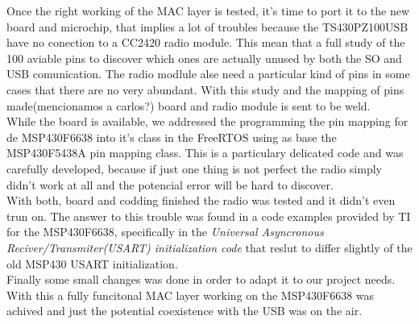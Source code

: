 		Once the right working of the MAC layer is tested, it's time to port it to the new board and microchip, that implies a lot of troubles because the TS430PZ100USB have no conection to a CC2420 radio module. This mean that a full study of the 100 aviable pins to discover which ones are actually unused by both the SO and USB comunication. The radio modlule alse need a particular kind of pins in some cases that there are no very abundant. With this study and the mapping of pins made(mencionamos a carlos?) board and radio module is sent to be weld.\\

		While the board is available, we addressed the programming the pin mapping for de MSP430F6638 into it's class in the FreeRTOS using as base the MSP430F5438A pin mapping class. This is a particulary delicated code and was carefully developed, because if just one thing is not perfect the radio simply didn't work at all and the potencial error will be hard to discover. \\

		With both, board and codding finished the radio was tested and it didn't even trun on. The answer to this trouble was found in a code examples provided by TI for the MSP430F6638, specifically in the \textit{Universal Asyncronous Reciver/Transmiter(USART) initialization code} that reslut to differ slightly of the old MSP430 USART initialization.\\

		Finally some small changes was done in order to adapt it to our project needs. With this a fully funcitonal MAC layer working on the MSP430F6638 was achived and just the potential coexistence with the USB was on the air.\\


